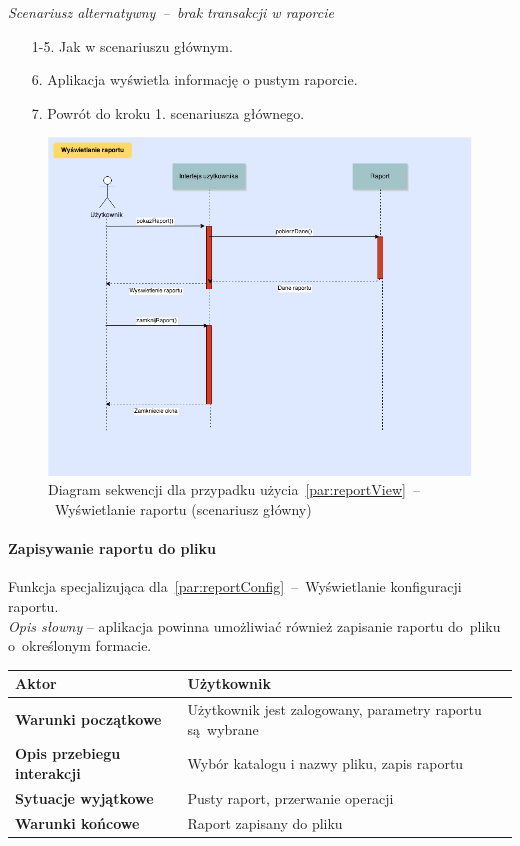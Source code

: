 \noindent \textit{Scenariusz alternatywny~--~brak transakcji w raporcie}
\begin{enumerate}
  \item[1-5.] Jak w scenariuszu głównym.
  \item[6.] Aplikacja wyświetla informację o pustym raporcie.
  \item[7.] Powrót do kroku 1. scenariusza głównego.
\end{enumerate}

\begin{figure}[H]
  \includegraphics[width=\textwidth]{images/raport_show.png}
  \caption{Diagram sekwencji dla przypadku użycia~\ref{par:reportView}~--~Wyświetlanie raportu (scenariusz główny)}
\end{figure}

\paragraph{Zapisywanie raportu do pliku\newline}
\label{par:reportExport}
\indent Funkcja specjalizująca dla~\ref{par:reportConfig}~--~Wyświetlanie konfiguracji raportu.\\

\textit{Opis słowny} -- aplikacja powinna umożliwiać również zapisanie raportu do~pliku o~określonym formacie.

\begin{longtable}{|p{5cm}|p{7cm}|}
  \hline \textbf{Aktor} & Użytkownik \\
  \hline \textbf{Warunki początkowe} & Użytkownik jest zalogowany, parametry raportu są~wybrane \\
  \hline \textbf{Opis przebiegu interakcji} & Wybór katalogu i nazwy pliku, zapis raportu \\
  \hline \textbf{Sytuacje wyjątkowe} & Pusty raport, przerwanie operacji \\
  \hline \textbf{Warunki końcowe} & Raport zapisany do pliku \\
  \hline
\end{longtable}

